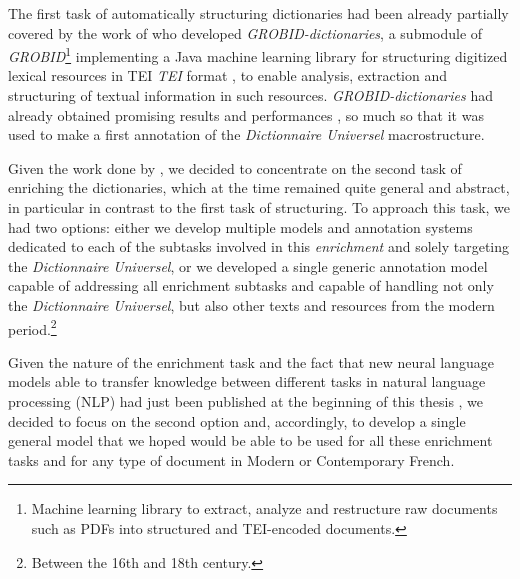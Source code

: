 The first task of automatically structuring dictionaries had been already partially covered by the work of \citet{khemakhem-etal-2017-automatic,khemakhem-etal-2018-enhancing} who developed \emph{GROBID-dictionaries}, a submodule of \emph{GROBID}\footnote{Machine learning library to extract, analyze and restructure raw documents such as PDFs into structured and TEI-encoded documents.} \citep{lopez-etal-2018-grobid} implementing a Java machine learning library for structuring digitized lexical resources in TEI \emph{TEI} format \citep{tei-2018-guidelines}, to enable analysis, extraction and structuring of textual information in such resources. \emph{GROBID-dictionaries} had already obtained promising results and performances \citep{khemakhem-2020-standard}, so much so that it was used to make a first annotation of the \emph{Dictionnaire Universel} macrostructure.

Given the work done by \citet{khemakhem-2020-standard}, we decided to concentrate on the second task of enriching the dictionaries, which at the time remained quite general and abstract, in particular in contrast to the first task of structuring. To approach this task, we had two options: either we develop multiple models and annotation systems dedicated to each of the subtasks involved in this \emph{enrichment} and solely targeting the \emph{Dictionnaire Universel}, or we developed a single generic annotation model capable of addressing all enrichment subtasks and capable of handling not only the \emph{Dictionnaire Universel}, but also other texts and resources from the modern period.\footnote{Between the 16th and 18th century.}

Given the nature of the enrichment task and the fact that new neural language models able to transfer knowledge between different tasks in natural language processing (NLP) had just been published at the beginning of this thesis \cite{peters-etal-2018-deep,devlin-etal-2019-bert}, we decided to focus on the second option and, accordingly, to develop a single general model that we hoped would be able to be used for all these enrichment tasks and for any type of document in Modern or Contemporary French.


